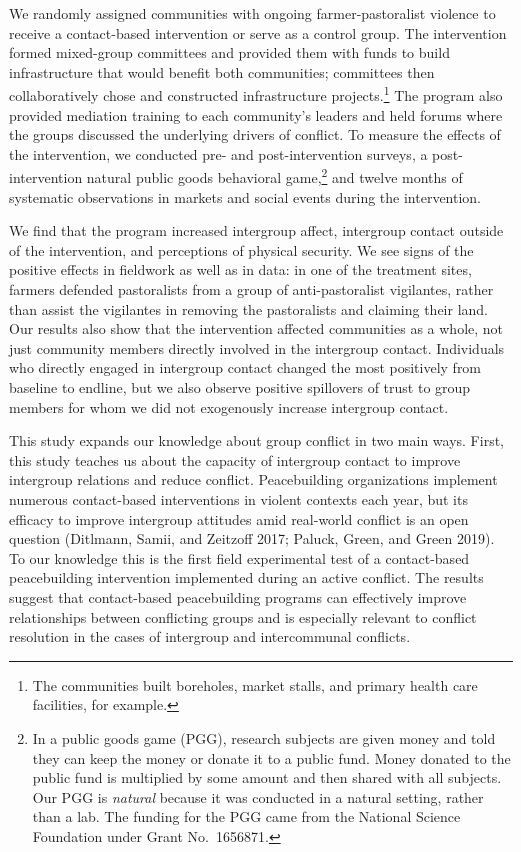 \documentclass[11pt]{article}
\begin{document}
We randomly assigned communities with ongoing farmer-pastoralist
violence to receive a contact-based intervention or serve as a control
group. The intervention formed mixed-group committees and provided them
with funds to build infrastructure that would benefit both communities;
committees then collaboratively chose and constructed infrastructure
projects.\footnote{The communities built boreholes, market stalls, and
  primary health care facilities, for example.} The program also
provided mediation training to each community's leaders and held forums
where the groups discussed the underlying drivers of conflict. To
measure the effects of the intervention, we conducted pre- and
post-intervention surveys, a post-intervention natural public goods
behavioral game,\footnote{In a public goods game (PGG), research
  subjects are given money and told they can keep the money or donate it
  to a public fund. Money donated to the public fund is multiplied by
  some amount and then shared with all subjects. Our PGG is
  \emph{natural} because it was conducted in a natural setting, rather
  than a lab. The funding for the PGG came from the National Science
  Foundation under Grant No.~1656871.} and twelve months of systematic
observations in markets and social events during the intervention.

We find that the program increased intergroup affect, intergroup contact
outside of the intervention, and perceptions of physical security. We
see signs of the positive effects in fieldwork as well as in data: in
one of the treatment sites, farmers defended pastoralists from a group
of anti-pastoralist vigilantes, rather than assist the vigilantes in
removing the pastoralists and claiming their land. Our results also show
that the intervention affected communities as a whole, not just
community members directly involved in the intergroup contact.
Individuals who directly engaged in intergroup contact changed the most
positively from baseline to endline, but we also observe positive
spillovers of trust to group members for whom we did not exogenously
increase intergroup contact.

This study expands our knowledge about group conflict in two main ways.
First, this study teaches us about the capacity of intergroup contact to
improve intergroup relations and reduce conflict. Peacebuilding
organizations implement numerous contact-based interventions in violent
contexts each year, but its efficacy to improve intergroup attitudes
amid real-world conflict is an open question (Ditlmann, Samii, and
Zeitzoff 2017; Paluck, Green, and Green 2019). To our knowledge this is
the first field experimental test of a contact-based peacebuilding
intervention implemented during an active conflict. The results suggest
that contact-based peacebuilding programs can effectively improve
relationships between conflicting groups and is especially relevant to
conflict resolution in the cases of intergroup and intercommunal
conflicts.
\end{document}
